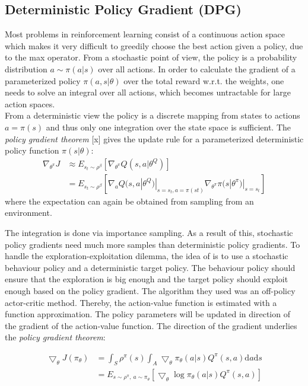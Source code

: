 \subsection{Deterministic Policy Gradient (DPG)}
\label{sec:DPG}
\nocite{lillicrap2015continuous}
Most problems in reinforcement learning consist of a continuous action space which makes it very difficult to greedily choose the best action given a policy, due to the max operator. From a stochastic point of view, the policy is a probability distribution $a\sim\pi(a|s)$ over all actions. In order to calculate the gradient of a parameterized policy $\pi(a,s|\theta)$ over the total reward w.r.t. the weights, one needs to solve an integral over all actions, which becomes untractable for large action spaces.\\
From a deterministic view the policy is a discrete mapping from states to actions $a=\pi(s)$ and thus only one integration over the state space is sufficient. The \textit{policy gradient theorem} [x] gives the update rule for a parameterized deterministic policy function $\pi(s|\theta)$:
\begin{align*}
\nabla_{\theta^\pi}J
&\approx E_{s_t\sim\rho^\beta}\left[\nabla_{\theta^\pi}Q(s,a|\theta^Q)\right] \\
&= E_{s_t\sim\rho^\beta}\left[\nabla_aQ(s,a|\theta^Q)|_{s=s_t,a=\pi(st)} \nabla_{\theta^\pi}\pi(s|\theta^\pi)|_{s=s_t}\right]
\end{align*}
where the expectation can again be obtained from sampling from an environment.


The integration is done via importance sampling. As a result of this, stochastic policy gradients need much more samples than deterministic policy gradients. To handle the exploration-exploitation dilemma, the idea of \citeauthor{silver2014deterministic} is to use a stochastic behaviour policy and a deterministic target policy. The behaviour policy should ensure that the exploration is big enough and the target policy should exploit enough based on 
the policy gradient. The algorithm they used was an off-policy actor-critic method. Thereby, the action-value function is estimated with a function approximation. The policy parameters will be updated in direction of the gradient of the action-value function. The direction of the gradient underlies 
the \textit{policy gradient theorem}: 

\begin{align*}
\bigtriangledown_\theta 
J(\pi_\theta)&=\int_{S}^{}\rho^\pi(s)\int_{A}\bigtriangledown_\theta 
\pi_\theta(a|s)Q^\pi(s,a)\mathrm{d}a\mathrm{d}s\\
&=E_{s \sim \rho^\pi,\: a\sim\pi_\theta}[\bigtriangledown_\theta \log 
\pi_\theta (a|s)Q^\pi(s,a)]
\end{align*}%


